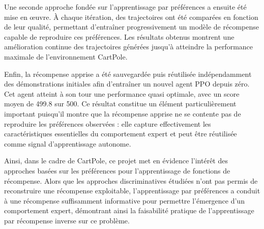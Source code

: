 Une seconde approche fondée sur l'apprentissage par préférences a ensuite été mise en œuvre. À chaque itération, des trajectoires ont été comparées en fonction de leur qualité, permettant d'entraîner progressivement un modèle de récompense capable de reproduire ces préférences. Les résultats obtenus montrent une amélioration continue des trajectoires générées jusqu'à atteindre la performance maximale de l'environnement CartPole.

Enfin, la récompense apprise a été sauvegardée puis réutilisée indépendamment des démonstrations initiales afin d'entraîner un nouvel agent PPO depuis zéro. Cet agent atteint à son tour une performance quasi optimale, avec un score moyen de 499.8 sur 500. Ce résultat constitue un élément particulièrement important puisqu'il montre que la récompense apprise ne se contente pas de reproduire les préférences observées : elle capture effectivement les caractéristiques essentielles du comportement expert et peut être réutilisée comme signal d'apprentissage autonome.

Ainsi, dans le cadre de CartPole, ce projet met en évidence l'intérêt des approches basées sur les préférences pour l'apprentissage de fonctions de récompense. Alors que les approches discriminatives étudiées n'ont pas permis de reconstruire une récompense exploitable, l'apprentissage par préférences a conduit à une récompense suffisamment informative pour permettre l'émergence d'un comportement expert, démontrant ainsi la faisabilité pratique de l'apprentissage par récompense inverse sur ce problème.

\newpage
\printbibliography





